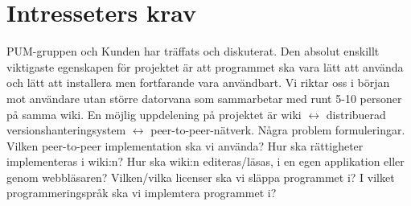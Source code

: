 \section{Intresseters krav}
PUM-gruppen och Kunden har träffats och diskuterat. Den absolut enskillt viktigaste egenskapen för projektet är att programmet ska vara lätt att använda och lätt att installera men fortfarande vara användbart.  Vi riktar oss i början mot användare utan större datorvana som sammarbetar med runt 5-10 personer på samma wiki. En möjlig uppdelening på projektet är wiki $\leftrightarrow$ distribuerad versionshanteringsystem $\leftrightarrow$ peer-to-peer-nätverk. Några problem formuleringar. Vilken peer-to-peer implementation ska vi använda? Hur ska rättigheter implementeras i wiki:n? Hur ska wiki:n editeras/läsas, i en egen applikation eller genom webbläsaren? Vilken/vilka licenser ska vi släppa programmet i? I vilket programmeringspråk ska vi implemtera programmet i?

